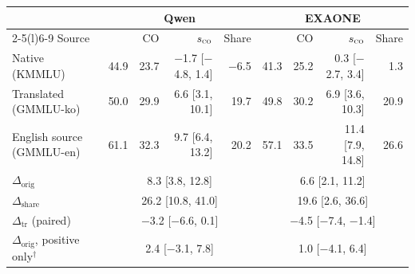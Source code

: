 \begin{tabular}{@{}lrrrrrrrr@{}}
\toprule
 & \multicolumn{4}{c}{Qwen} & \multicolumn{4}{c}{EXAONE} \\
\cmidrule(lr){2-5}\cmidrule(l){6-9}
Source & \full{} & \textsc{CO} & $s_{\textsc{co}}$ & Share & \full{} & \textsc{CO} & $s_{\textsc{co}}$ & Share \\
\midrule
Native (KMMLU) & 44.9 & 23.7 & $-$1.7 {\scriptsize[$-$4.8, 1.4]} & $-$6.5 & 41.3 & 25.2 & 0.3 {\scriptsize[$-$2.7, 3.4]} & 1.3 \\
Translated (GMMLU-ko) & 50.0 & 29.9 & 6.6 {\scriptsize[3.1, 10.1]} & 19.7 & 49.8 & 30.2 & 6.9 {\scriptsize[3.6, 10.3]} & 20.9 \\
English source (GMMLU-en) & 61.1 & 32.3 & 9.7 {\scriptsize[6.4, 13.2]} & 20.2 & 57.1 & 33.5 & 11.4 {\scriptsize[7.9, 14.8]} & 26.6 \\
\midrule
$\Delta_{\mathrm{orig}}$ & \multicolumn{4}{c}{8.3 {\scriptsize[3.8, 12.8]}} & \multicolumn{4}{c}{6.6 {\scriptsize[2.1, 11.2]}} \\
$\Delta_{\mathrm{share}}$ & \multicolumn{4}{c}{26.2 {\scriptsize[10.8, 41.0]}} & \multicolumn{4}{c}{19.6 {\scriptsize[2.6, 36.6]}} \\
$\Delta_{\mathrm{tr}}$ (paired) & \multicolumn{4}{c}{$-$3.2 {\scriptsize[$-$6.6, 0.1]}} & \multicolumn{4}{c}{$-$4.5 {\scriptsize[$-$7.4, $-$1.4]}} \\
$\Delta_{\mathrm{orig}}$, positive only$^{\dagger}$ & \multicolumn{4}{c}{2.4 {\scriptsize[$-$3.1, 7.8]}} & \multicolumn{4}{c}{1.0 {\scriptsize[$-$4.1, 6.4]}} \\
\bottomrule
\end{tabular}
